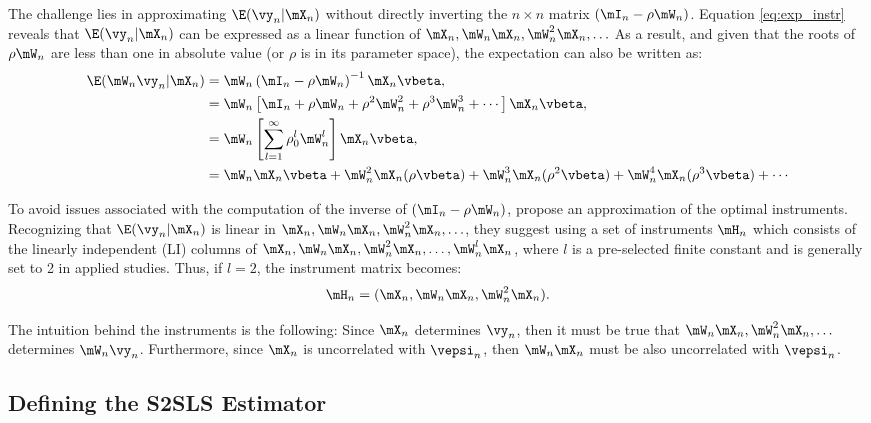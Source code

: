 \documentclass[english,12pt]{book}\usepackage[]{graphicx}\usepackage[]{xcolor}
\begin{document}
The challenge lies in approximating  $\E(\vy_n|\mX_n)$ without directly inverting the $n\times n$ matrix $(\mI_n - \rho\mW_n)$. Equation \eqref{eq:exp_instr} reveals that $\E(\vy_n|\mX_n)$ can be expressed as a linear function of $\mX_n, \mW_n\mX_n, \mW^2_n\mX_n, \ldots$ As a result, and given that the roots of $\rho\mW_n$ are less than one in absolute value (or $\rho$ is in its parameter space), the expectation can also be written as:
\begin{equation*}
  \begin{aligned}
\E(\mW_n\vy_n|\mX_n) &  = \mW_n\left(\mI_n - \rho \mW_n\right)^{-1}\mX_n\vbeta, \\
               & = \mW_n\left[\mI_n + \rho\mW_n + \rho^2\mW^2_n + \rho^3\mW^3_n + \cdots\right]\mX_n\vbeta, \\
               & = \mW_n\left[\sum_{l = 1}^{\infty}\rho_0^{l}\mW^l_n\right]\mX_n\vbeta, \\
               & = \mW_n\mX_n\vbeta + \mW^2_n\mX_n(\rho\vbeta) + \mW^3_n\mX_n(\rho^2\vbeta) + \mW^4_n\mX_n(\rho^3\vbeta) + \cdots
  \end{aligned}
\end{equation*}

To avoid issues associated with the computation of the inverse of $(\mI_n - \rho\mW_n)$,  \cite{kelejian1998generalized, kelejian1999generalized} propose an approximation of the optimal instruments. Recognizing that $\E(\vy_n|\mX_n)$ is linear in $\mX_n, \mW_n\mX_n, \mW^2_n\mX_n, \ldots$, they suggest using a set of instruments $\mH_n$ which consists of the linearly independent (LI) columns of  $\mX_n, \mW_n\mX_n, \mW^2_n\mX_n, \ldots, \mW^l_n\mX_n$,  where $l$ is a pre-selected finite constant and is generally set to 2 in applied studies. Thus, if $l =2$, the instrument matrix becomes:
\begin{equation*}
  \mH_n = (\mX_n, \mW_n\mX_n, \mW^2_n\mX_n).
\end{equation*}

\begin{remark}
The intuition behind the instruments is the following: Since $\mX_n$ determines $\vy_n$, then it must be true that $\mW_n\mX_n, \mW^2_n\mX_n, \ldots$ determines $\mW_n\vy_n$. Furthermore, since $\mX_n$ is uncorrelated with $\vepsi_n$, then $\mW_n\mX_n$ must be also uncorrelated with $\vepsi_n$.
\end{remark}

\subsection{Defining the S2SLS Estimator}
\end{document}
